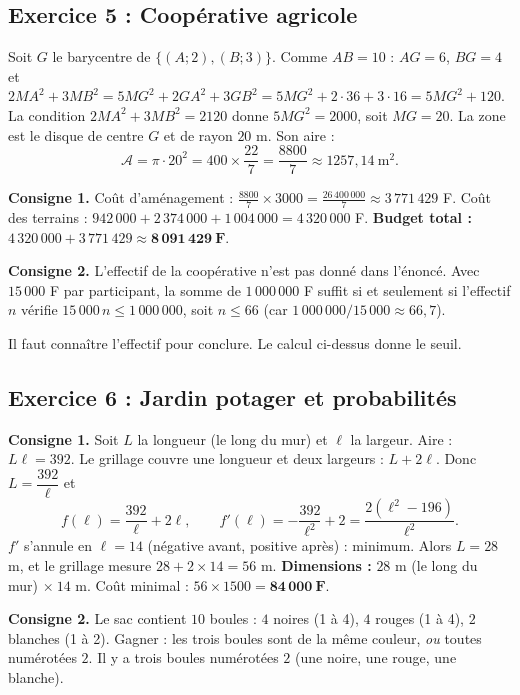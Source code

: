 \subsection{Exercice 5 : Coop\'erative agricole}

Soit $G$ le barycentre de $\{(A;2),(B;3)\}$. Comme $AB=10$ : $AG=6$, $BG=4$ et
$2MA^2+3MB^2=5MG^2+2GA^2+3GB^2=5MG^2+2\cdot36+3\cdot16=5MG^2+120$.
La condition $2MA^2+3MB^2=2120$ donne $5MG^2=2000$, soit $MG=20$.
La zone est le disque de centre $G$ et de rayon $20$ m. Son aire :
\[
\mathcal A=\pi\cdot20^2=400\times\frac{22}{7}=\frac{8800}{7}\approx 1257{,}14\ \text{m}^2.
\]

\medskip\noindent\textbf{Consigne 1.} Co\^ut d'am\'enagement : $\frac{8800}{7}\times 3000=\frac{26\,400\,000}{7}\approx 3\,771\,429$ F.
Co\^ut des terrains : $942\,000+2\,374\,000+1\,004\,000=4\,320\,000$ F.
\textbf{Budget total :} $4\,320\,000+3\,771\,429\approx \mathbf{8\,091\,429\ F}$.

\medskip\noindent\textbf{Consigne 2.} L'effectif de la coop\'erative n'est pas donn\'e dans l'\'enonc\'e.
Avec $15\,000$ F par participant, la somme de $1\,000\,000$ F suffit si et seulement si l'effectif $n$ v\'erifie
$15\,000\,n\le 1\,000\,000$, soit $n\le 66$ (car $1\,000\,000/15\,000\approx 66{,}7$).
\begin{rem} Il faut conna\^itre l'effectif pour conclure. Le calcul ci-dessus donne le seuil.\end{rem}

\subsection{Exercice 6 : Jardin potager et probabilit\'es}

\textbf{Consigne 1.} Soit $L$ la longueur (le long du mur) et $\ell$ la largeur. Aire : $L\ell=392$.
Le grillage couvre une longueur et deux largeurs : $L+2\ell$. Donc $L=\dfrac{392}{\ell}$ et
\[
f(\ell)=\frac{392}{\ell}+2\ell,\qquad f'(\ell)=-\frac{392}{\ell^2}+2=\frac{2(\ell^2-196)}{\ell^2}.
\]
$f'$ s'annule en $\ell=14$ (n\'egative avant, positive apr\`es) : minimum.
Alors $L=28$ m, et le grillage mesure $28+2\times14=56$ m.
\textbf{Dimensions :} $28$ m (le long du mur) $\times\ 14$ m. Co\^ut minimal : $56\times1500=\mathbf{84\,000\ F}$.

\medskip\noindent\textbf{Consigne 2.} Le sac contient $10$ boules : $4$ noires (1 \`a 4), $4$ rouges (1 \`a 4), $2$ blanches (1 \`a 2).
Gagner : les trois boules sont de la m\^eme couleur, \emph{ou} toutes num\'erot\'ees $2$.
Il y a trois boules num\'erot\'ees $2$ (une noire, une rouge, une blanche).

